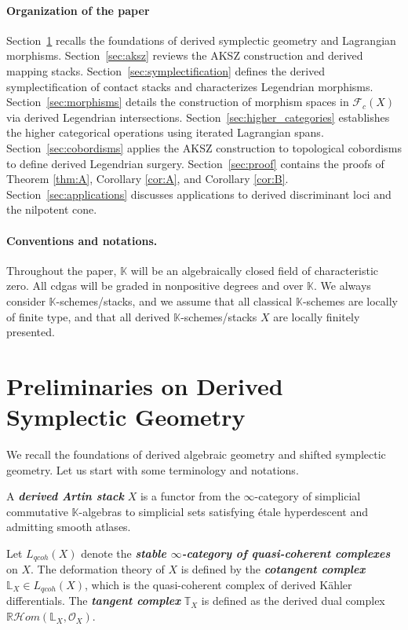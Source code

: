 \documentclass[reqno]{amsart}
\newcommand{\bfem}[1]{\textbf{\textit{#1}}}
\newcommand{\LL}{\mathbb{L}}
\newcommand{\TT}{\mathbb{T}}
\newcommand{\cO}{\mathcal{O}}
\newcommand{\K}{\mathbb{K}}
\begin{document}
\paragraph{\bf Organization of the paper}
Section~\ref{sec:foundations} recalls the foundations of derived symplectic geometry and Lagrangian morphisms. Section~\ref{sec:aksz} reviews the AKSZ construction and derived mapping stacks. Section~\ref{sec:symplectification} defines the derived symplectification of contact stacks and characterizes Legendrian morphisms. Section~\ref{sec:morphisms} details the construction of morphism spaces in $\mathcal{F}_{c}(X)$ via derived Legendrian intersections. Section~\ref{sec:higher_categories} establishes the higher categorical operations using iterated Lagrangian spans. Section~\ref{sec:cobordisms} applies the AKSZ construction to topological cobordisms to define derived Legendrian surgery. Section~\ref{sec:proof} contains the proofs of Theorem \ref{thm:A}, Corollary \ref{cor:A}, and Corollary \ref{cor:B}. Section~\ref{sec:applications} discusses applications to derived discriminant loci and the nilpotent cone.
\vspace{0.1in}

\paragraph{\bf Conventions and notations.} Throughout the paper, $ \mathbb{K} $ will be an algebraically closed field of characteristic zero. All cdgas will be graded in nonpositive degrees and over $\mathbb{K}.$ We always consider $\K$-schemes/stacks, and we assume that all classical $ \K $-schemes are locally of finite type, and that all derived $ \K $-schemes/stacks $ {X} $ are locally finitely presented.
\section{Preliminaries on Derived Symplectic Geometry}\label{sec:foundations}

We recall the foundations of derived algebraic geometry and shifted symplectic geometry. Let us start with some terminology and notations.

A \bfem{derived Artin stack} $X$ is a functor from the $\infty$-category of simplicial commutative $\K$-algebras to simplicial sets satisfying \'etale hyperdescent and admitting smooth atlases. 
\vspace{1in}

Let $L_{qcoh}(X)$ denote the \bfem{stable $\infty$-category of quasi-coherent complexes} on $X$. The deformation theory of $X$ is defined by the \bfem{cotangent complex} $\LL_{X} \in L_{qcoh}(X)$, which is the quasi-coherent complex of derived K\"{a}hler differentials. The \bfem{tangent complex} $\TT_{X}$ is defined as the derived dual complex $\mathbb{R}\mathcal{H}om(\LL_{X}, \cO_{X})$.
\end{document}
